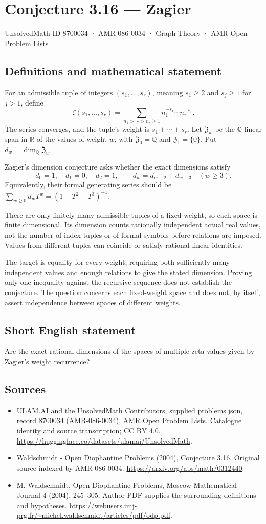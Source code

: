 \documentclass[11pt,a4paper]{article}
\begin{document}
\section*{Conjecture 3.16 — Zagier}\label{8700034}
{\small UnsolvedMath ID 8700034 · AMR-086-0034 · Graph Theory · AMR Open Problem Lists}
\subsection{Definitions and mathematical statement}
For an admissible tuple of integers $(s_1,\ldots,s_r)$, meaning $s_1\ge2$ and $s_j\ge1$ for $j>1$, define
\[
\zeta(s_1,\ldots,s_r)=\sum_{n_1>\cdots>n_r\ge1}
 n_1^{-s_1}\cdots n_r^{-s_r}.
\]
The series converges, and the tuple's weight is $s_1+\cdots+s_r$. Let $\mathfrak Z_w$ be the $\mathbb Q$-linear span in $\mathbb R$ of the values of weight $w$, with $\mathfrak Z_0=\mathbb Q$ and $\mathfrak Z_1=\{0\}$. Put $d_w=\dim_{\mathbb Q}\mathfrak Z_w$.

Zagier's dimension conjecture asks whether the exact dimensions satisfy
\[
d_0=1,\quad d_1=0,\quad d_2=1,\qquad
 d_w=d_{w-2}+d_{w-3}\quad(w\ge3).
\]
Equivalently, their formal generating series should be $\sum_{w\ge0}d_w T^w=(1-T^2-T^3)^{-1}$.

There are only finitely many admissible tuples of a fixed weight, so each space is finite dimensional. Its dimension counts rationally independent actual real values, not the number of index tuples or of formal symbols before relations are imposed. Values from different tuples can coincide or satisfy rational linear identities.

The target is equality for every weight, requiring both sufficiently many independent values and enough relations to give the stated dimension. Proving only one inequality against the recursive sequence does not establish the conjecture. The question concerns each fixed-weight space and does not, by itself, assert independence between spaces of different weights.
\subsection{Short English statement}
Are the exact rational dimensions of the spaces of multiple zeta values given by Zagier’s weight recurrence?
\subsection{Sources}
\begin{itemize}
\item[S1] ULAM.AI and the UnsolvedMath Contributors, supplied problems.json, record 8700034 (AMR-086-0034), AMR Open Problem Lists. Catalogue identity and source transcription; CC BY 4.0.
\url{https://huggingface.co/datasets/ulamai/UnsolvedMath}.
\item[S2] Waldschmidt - Open Diophantine Problems (2004), Conjecture 3.16. Original source indexed by AMR-086-0034.
\url{https://arxiv.org/abs/math/0312440}.
\item[S3] M. Waldschmidt, Open Diophantine Problems, Moscow Mathematical Journal 4 (2004), 245–305. Author PDF supplies the surrounding definitions and hypotheses.
\url{https://webusers.imj-prg.fr/~michel.waldschmidt/articles/pdf/odp.pdf}.
\end{itemize}
\end{document}
